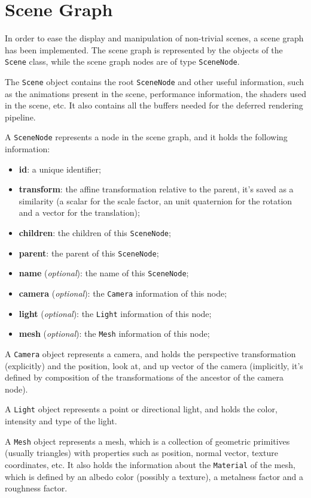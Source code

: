 \documentclass[11pt,a4paper]{report}
\begin{document}
\section{Scene Graph}
In order to ease the display and manipulation of non-trivial scenes, a scene graph has been implemented. The scene graph is represented by the objects of the \texttt{Scene} class, while the scene graph nodes are of type \texttt{SceneNode}.

The \texttt{Scene} object contains the root \texttt{SceneNode} and other useful information, such as the animations present in the scene, performance information, the shaders used in the scene, etc. It also contains all the buffers needed for the deferred rendering pipeline.

A \texttt{SceneNode} represents a node in the scene graph, and it holds the following information:
\begin{itemize}
	\item \textbf{id}: a unique identifier;
	\item \textbf{transform}: the affine transformation relative to the parent, it's saved as a similarity (a scalar for the scale factor, an unit quaternion for the rotation and a vector for the translation);
	\item \textbf{children}: the children of this \texttt{SceneNode};
	\item \textbf{parent}: the parent of this \texttt{SceneNode};
	\item \textbf{name} (\textit{optional}): the name of this \texttt{SceneNode};
	\item \textbf{camera} (\textit{optional}): the \texttt{Camera} information of this node;
	\item \textbf{light} (\textit{optional}): the \texttt{Light} information of this node;
	\item \textbf{mesh} (\textit{optional}): the \texttt{Mesh} information of this node;
\end{itemize}

A \texttt{Camera} object represents a camera, and holds the perspective transformation (explicitly) and the position, look at, and up vector of the camera (implicitly, it's defined by composition of the transformations of the ancestor of the camera node).

A \texttt{Light} object represents a point or directional light, and holds the color, intensity and type of the light.

A \texttt{Mesh} object represents a mesh, which is a collection of geometric primitives (usually triangles) with properties such as position, normal vector, texture coordinates, etc. It also holds the information about the \texttt{Material} of the mesh, which is defined by an albedo color (possibly a texture), a metalness factor and a roughness factor.
\end{document}
